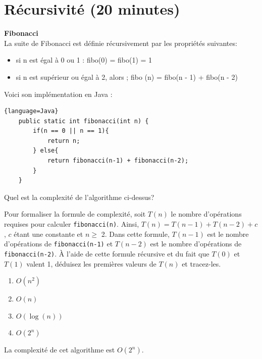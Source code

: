 \section{Récursivité (20 minutes) }
\begin{Exercice} [5 minutes] \textbf{Fibonacci}\\
\label{exercice:1}
    La suite de Fibonacci est définie récursivement par les propriétés suivantes:
    \begin{itemize}
        \item si n est égal à 0 ou 1 : fibo(0) = fibo(1) = 1
        \item si n est supérieur ou égal à 2, alors ; fibo (n) = fibo(n - 1) + fibo(n - 2)
    \end{itemize}
    
    Voici son implémentation en Java :
    
    \begin{lstlisting}{language=Java}
    public static int fibonacci(int n) {
        if(n == 0 || n == 1){
            return n;
        } else{
            return fibonacci(n-1) + fibonacci(n-2);
        }
    } \end{lstlisting}
    
    Quel est la complexité de l'algorithme ci-dessus?
    
    \begin{conseil} 
    
    Pour formaliser la formule de complexité, soit $T(n)$ le nombre d'opérations requises pour calculer \lstinline{fibonacci(n)}. Ainsi, $T(n) = T(n-1) + T(n-2) + c$, $c$ étant une constante et $n \geq$ 2. Dans cette formule, $T(n-1)$ est le nombre d'opérations de \lstinline{fibonacci(n-1)} et $T(n-2)$ est le nombre d'opérations de \lstinline{fibonacci(n-2)}. À l'aide de cette formule récursive et du fait que $T(0)$ et $T(1)$ valent 1, déduisez les premières valeurs de $T(n)$ et tracez-les.  \newline


    \end{conseil}
    
    \begin{enumerate}
        \item $O(n^2)$
        \item $O(n)$
        \item $O(\log(n))$
        \item $O(2^n)$
    \end{enumerate}
    
    \begin{solution}
        La complexité de cet algorithme est $O(2^n)$. \newline 
        

\end{solution}
\end{Exercice}
